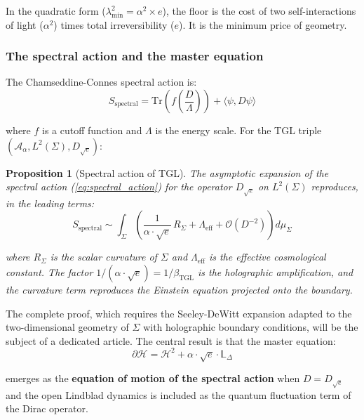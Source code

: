 \documentclass[12pt,a4paper,twoside]{article}
\newtheorem{proposition}[theorem]{Proposition}
\newcommand{\betatgl}{\beta_{\!\scriptscriptstyle\mathrm{TGL}}}
\newcommand{\boundary}{\textit{boundary}}
\begin{document}
In the quadratic form ($\lambda_{\min}^2 = \alpha^2 \times e$), the floor is the cost of two self-interactions of light ($\alpha^2$) times total irreversibility ($e$). It is the minimum price of geometry.

\subsubsection{The spectral action and the master equation}

The Chamseddine-Connes spectral action \cite{Chamseddine1997} is:
\begin{equation}
S_{\text{spectral}} = \text{Tr}\!\left(f\!\left(\frac{D}{\Lambda}\right)\right) + \langle \psi, D\psi \rangle
\label{eq:spectral_action}
\end{equation}

\noindent where $f$ is a cutoff function and $\Lambda$ is the energy scale. For the TGL triple $(\mathcal{A}_\alpha, L^2(\Sigma), D_{\sqrt{e}})$:

\begin{proposition}[Spectral action of TGL]
\label{prop:acao_espectral}
The asymptotic expansion of the spectral action (\ref{eq:spectral_action}) for the operator $D_{\sqrt{e}}$ on $L^2(\Sigma)$ reproduces, in the leading terms:
\begin{equation}
S_{\text{spectral}} \sim \int_\Sigma \left(\frac{1}{\alpha \cdot \sqrt{e}}\, R_\Sigma + \Lambda_{\text{eff}} + \mathcal{O}(D^{-2})\right) d\mu_\Sigma
\end{equation}

\noindent where $R_\Sigma$ is the scalar curvature of $\Sigma$ and $\Lambda_{\text{eff}}$ is the effective cosmological constant. The factor $1/(\alpha \cdot \sqrt{e}) = 1/\betatgl$ is the holographic amplification, and the curvature term reproduces the Einstein equation projected onto the \boundary{}.
\end{proposition}

The complete proof, which requires the Seeley-DeWitt expansion adapted to the two-dimensional geometry of $\Sigma$ with holographic boundary conditions, will be the subject of a dedicated article. The central result is that the master equation:
\begin{equation}
\partial\mathcal{H} = \mathcal{H}^2 + \alpha \cdot \sqrt{e} \cdot \mathbb{L}_\Delta
\end{equation}

\noindent emerges as the \textbf{equation of motion of the spectral action} when $D = D_{\sqrt{e}}$ and the open Lindblad dynamics is included as the quantum fluctuation term of the Dirac operator.
\end{document}
